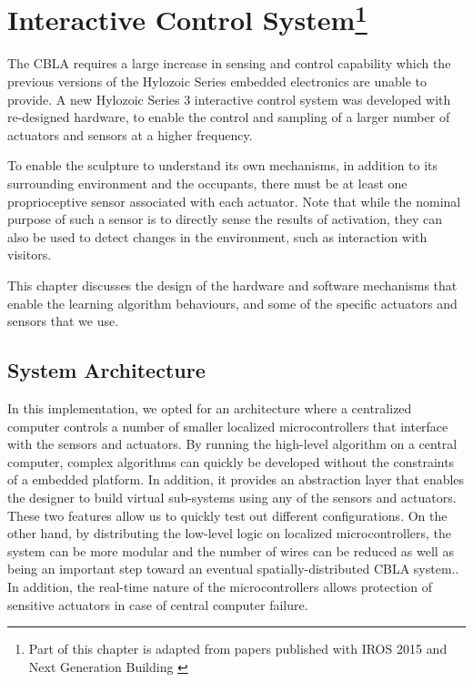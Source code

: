 \chapter[Interactive Control System]
{Interactive Control System\footnote{Part of this chapter is adapted from papers published with IROS 2015 \cite{Chan2015} and Next Generation Building \cite{Gorbet2015}}} 
\label{chap:ctrl_system}

The CBLA requires a large increase in sensing and control capability which the previous versions of the Hylozoic Series embedded electronics \cite{Beesley2010} are unable to provide. A new Hylozoic Series 3 interactive control system was developed with re-designed hardware, to enable the control and sampling of a larger number of actuators and sensors at a higher frequency. 

To enable the sculpture to understand its own mechanisms, in addition to its surrounding environment and the occupants, there must be at least one proprioceptive sensor associated with each actuator. Note that while the nominal purpose of such a sensor is to directly sense the results of activation, they can also be used to detect changes in the environment, such as interaction with visitors.

This chapter discusses the design of the hardware and software mechanisms that enable the learning algorithm behaviours, and some of the specific actuators and sensors that we use. 


\section{System Architecture}

In this implementation, we opted for an architecture where a centralized computer controls a number of smaller localized microcontrollers that interface with the sensors and actuators. By running the high-level algorithm on a central computer, complex algorithms can quickly be developed without the constraints of a embedded platform. In addition, it provides an abstraction layer that enables the designer to build virtual sub-systems using any of the sensors and actuators. These two features allow us to quickly test out different configurations. On the other hand, by distributing the low-level logic on localized microcontrollers, the system can be more modular and the number of wires can be reduced as well as being an important step toward an eventual spatially-distributed CBLA system.. In addition, the real-time nature of the microcontrollers allows protection of sensitive actuators in case of central computer failure. 

